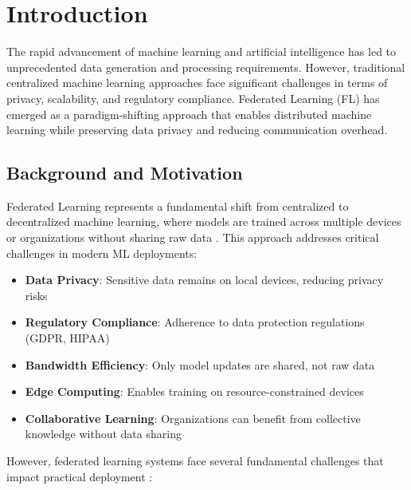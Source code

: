 \section{Introduction}

The rapid advancement of machine learning and artificial intelligence has led to unprecedented data generation and processing requirements. However, traditional centralized machine learning approaches face significant challenges in terms of privacy, scalability, and regulatory compliance. Federated Learning (FL) \cite{mcmahan2017communication} has emerged as a paradigm-shifting approach that enables distributed machine learning while preserving data privacy and reducing communication overhead.

\subsection{Background and Motivation}

Federated Learning represents a fundamental shift from centralized to decentralized machine learning, where models are trained across multiple devices or organizations without sharing raw data \cite{li2020federated}. This approach addresses critical challenges in modern ML deployments:

\begin{itemize}    \item \textbf{Data Privacy}: Sensitive data remains on local devices, reducing privacy risks
    \item \textbf{Regulatory Compliance}: Adherence to data protection regulations (GDPR, HIPAA)
    \item \textbf{Bandwidth Efficiency}: Only model updates are shared, not raw data
    \item \textbf{Edge Computing}: Enables training on resource-constrained devices \cite{wang2019edge}
    \item \textbf{Collaborative Learning}: Organizations can benefit from collective knowledge without data sharing
\end{itemize}

However, federated learning systems face several fundamental challenges that impact practical deployment \cite{kairouz2019advances}:

